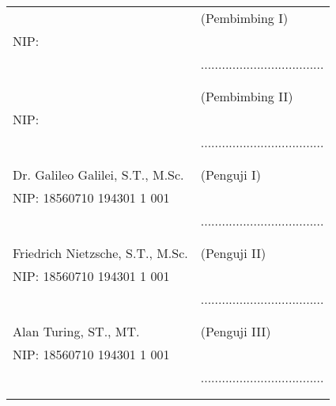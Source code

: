 \noindent
\begin{tabularx}{\textwidth}{X l}
  \advisor{}                       & (Pembimbing I)                      \\
  NIP: \advisornip{}               &                                     \\
                                   & ................................... \\
                                   &                                     \\
                                   &                                     \\
  \coadvisor{}                     & (Pembimbing II)                     \\
  NIP: \coadvisornip{}             &                                     \\
                                   & ................................... \\
                                   &                                     \\
                                   &                                     \\
  Dr. Galileo Galilei, S.T., M.Sc. & (Penguji I)                         \\
  NIP: 18560710 194301 1 001       &                                     \\
                                   & ................................... \\
                                   &                                     \\
                                   &                                     \\
  Friedrich Nietzsche, S.T., M.Sc. & (Penguji II)                        \\
  NIP: 18560710 194301 1 001       &                                     \\
                                   & ................................... \\
                                   &                                     \\
                                   &                                     \\
  Alan Turing, ST., MT.            & (Penguji III)                       \\
  NIP: 18560710 194301 1 001       &                                     \\
                                   & ................................... \\
                                   &                                     \\
                                   &                                     \\
\end{tabularx}
